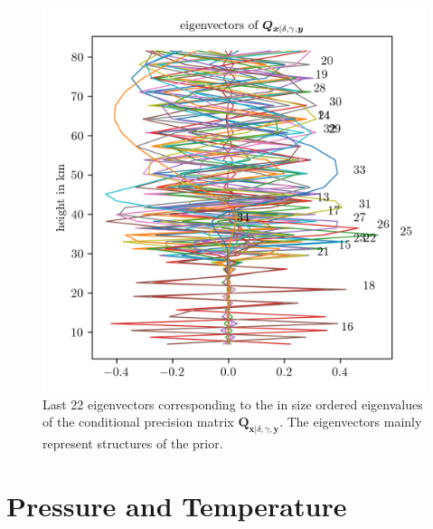  \begin{figure}[ht!]
 	\centering
 	\includegraphics{CovEigVec2.png}
 	\caption[Last 22 eigenvectors of conditional precision matrix.]{Last 22 eigenvectors corresponding to the in size ordered eigenvalues of the conditional precision matrix $\bm{Q}_{ \bm{x}|\delta, \gamma, \bm{y}}$. The eigenvectors mainly represent structures of the prior.}
 	\label{fig:CovEigVec2}
 \end{figure}
\clearpage
\section{Pressure and Temperature}

